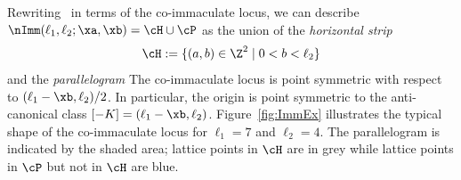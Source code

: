 Rewriting~\cite[Theorem VI.2]{immaculate} 
in terms of
{the co-immaculate} locus, we can describe 
$\nImm(\ell_1,\ell_2;\xa,\xb)=\cH\cup\cP$ 
as the union of the {\em horizontal strip}
$$
\cH:=\{(a,b)\in\Z^2\mid0<b<\ell_2\}
$$
and the {\em parallelogram}
The {co-immaculate} locus is point symmetric with 
respect to $(\ell_1-\xb,\ell_2)/2$. In 
particular, the origin is point symmetric to 
the anti-canonical class $[-K]=(\ell_1-\xb,\ell_2)$. 
Figure~\ref{fig:ImmEx} 
illustrates the typical shape of the {co-immaculate} 
locus for $\ell_1=7$ and $\ell_2=4$. The 
parallelogram is indicated by the shaded area; 
lattice points in $\cH$ are in grey while lattice 
points in $\cP$ but not in $\cH$ are blue.

